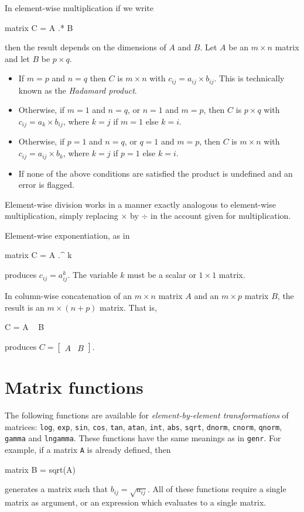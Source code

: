In element-wise multiplication if we write
%
\begin{code}
matrix C = A .* B
\end{code}
% 
then the result depends on the dimensions of $A$ and $B$.  Let $A$ be
an $m \times n$ matrix and let $B$ be $p \times q$.  
%
\begin{itemize}
\item If $m=p$ and $n=q$ then $C$ is $m\times n$ with $c_{ij} = a_{ij}
  \times b_{ij}$.  This is technically known as the \emph{Hadamard
    product}.
\item Otherwise, if $m=1$ and $n=q$, or $n=1$ and $m=p$, then $C$ is
  $p\times q$ with $c_{ij} = a_k \times b_{ij}$, where $k=j$ if $m=1$
  else $k=i$.
\item Otherwise, if $p=1$ and $n=q$, or $q=1$ and $m=p$, then $C$ is
  $m\times n$ with $c_{ij} = a_{ij} \times b_k$, where $k=j$ if $p=1$
  else $k=i$.
\item If none of the above conditions are satisfied the product is
  undefined and an error is flagged.
\end{itemize}

Element-wise division works in a manner exactly analogous to
element-wise multiplication, simply replacing $\times$ by $\div$ in
the account given for multiplication.

Element-wise exponentiation, as in 
%
\begin{code}
matrix C = A .^ k
\end{code}
% 
produces $c_{ij} = a_{ij}^k$.  The variable $k$ must be a scalar or
$1\times 1$ matrix.

In column-wise concatenation of an $m\times n$ matrix $A$ and
an $m\times p$ matrix $B$, the result is an $m\times (n+p)$ matrix.
That is,
%
\begin{code}
C = A ~ B
\end{code}
% 
produces $C = \left[ \begin{array}{cc} A & B \end{array} \right]$.

\section{Matrix functions}
\label{matrix-func}

The following functions are available for \textit{element-by-element
  transformations} of matrices: \texttt{log}, \texttt{exp},
\texttt{sin}, \texttt{cos}, \texttt{tan}, \texttt{atan}, \texttt{int},
\texttt{abs}, \texttt{sqrt}, \texttt{dnorm}, \texttt{cnorm},
\texttt{qnorm}, \texttt{gamma} and \texttt{lngamma}.  These functions
have the same meanings as in \texttt{genr}.  For example, if a matrix
\texttt{A} is already defined, then
%
\begin{code}
matrix B = sqrt(A)
\end{code}
%
generates a matrix such that $b_{ij} = \sqrt{a_{ij}}$.  All of these
functions require a single matrix as argument, or an expression which
evaluates to a single matrix.

